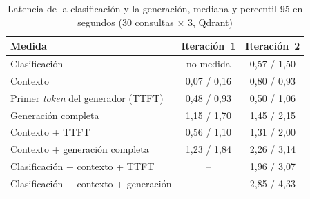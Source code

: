 \begin{table}[htbp!]
    \centering
    \caption{Latencia de la clasificación y la generación, mediana y percentil 95 en segundos (30 consultas $\times$ 3, Qdrant)}
    \label{tab:res-pe3-generacion}
    \small
    \begin{tabular}{|l|c|c|}
        \hline
        \textbf{Medida} & \textbf{Iteración~1} & \textbf{Iteración~2} \\
        \hline
        Clasificación & no medida & 0{,}57 / 1{,}50 \\
        \hline
        Contexto & 0{,}07 / 0{,}16 & 0{,}80 / 0{,}93 \\
        \hline
        Primer \textit{token} del generador (TTFT) & 0{,}48 / 0{,}93 & 0{,}50 / 1{,}06 \\
        \hline
        Generación completa & 1{,}15 / 1{,}70 & 1{,}45 / 2{,}15 \\
        \hline
        Contexto + TTFT & 0{,}56 / 1{,}10 & 1{,}31 / 2{,}00 \\
        \hline
        Contexto + generación completa & 1{,}23 / 1{,}84 & 2{,}26 / 3{,}14 \\
        \hline
        Clasificación + contexto + TTFT & -- & 1{,}96 / 3{,}07 \\
        \hline
        Clasificación + contexto + generación & -- & 2{,}85 / 4{,}33 \\
        \hline
    \end{tabular}
\end{table}
